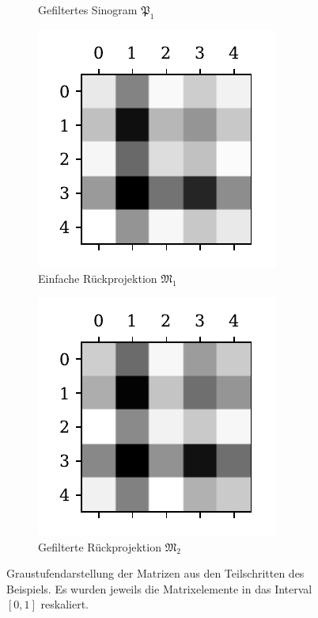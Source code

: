 \documentclass[slug=PET, room=Andreas-Schubert-Bau\,\ 424A,
supervisor=Carsten\ Bittrich, coursedate=10.\ 01.\ 2020, ngerman]{../../Lab_Report_LaTeX/lab_report}
\begin{document}
\begin{figure}[htp]
\begin{subfigure}[t]{.25\textwidth}
    \caption{Gefiltertes Sinogram \(\mathfrak{P}_1\)}
    \label{fig:theory-convoluted}
  \end{subfigure}
  \begin{subfigure}[t]{.25\textwidth}
    \centering
    \includegraphics[width=.6\textwidth]{../auswertung/figs/theory/rec_simple.pdf}
    \caption{Einfache R\"uckprojektion \(\mathfrak{M}_1\)}
    \label{fig:theory-rec_simple}
  \end{subfigure}
  \begin{subfigure}[t]{.25\textwidth}
    \centering
    \includegraphics[width=.6\textwidth]{../auswertung/figs/theory/rec_filtered.pdf}
    \caption{Gefilterte R\"uckprojektion \(\mathfrak{M}_2\)}
    \label{fig:theory-rec_filtered}
  \end{subfigure}
  \caption[Graustufendarstellung der
  Beispielmatrizen]{Graustufendarstellung der Matrizen aus den
    Teilschritten des Beispiels. Es wurden jeweils die Matrixelemente
    in das Interval \([0,1]\) reskaliert.}
  \label{fig:graubei}
\end{figure}
\end{document}

